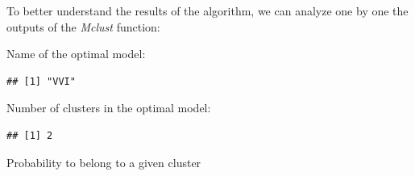 \documentclass[
]{article}
\newenvironment{Shaded}{\begin{snugshade}}{\end{snugshade}}
\newcommand{\AttributeTok}[1]{\textcolor[rgb]{0.77,0.63,0.00}{#1}}
\newcommand{\ConstantTok}[1]{\textcolor[rgb]{0.00,0.00,0.00}{#1}}
\newcommand{\DecValTok}[1]{\textcolor[rgb]{0.00,0.00,0.81}{#1}}
\newcommand{\FunctionTok}[1]{\textcolor[rgb]{0.00,0.00,0.00}{#1}}
\newcommand{\NormalTok}[1]{#1}
\newcommand{\SpecialCharTok}[1]{\textcolor[rgb]{0.00,0.00,0.00}{#1}}
\newcommand{\StringTok}[1]{\textcolor[rgb]{0.31,0.60,0.02}{#1}}
\begin{document}
To better understand the results of the algorithm, we can analyze one by
one the outputs of the \emph{Mclust} function:

Name of the optimal model:

\begin{Shaded}
\end{Shaded}

\begin{verbatim}
## [1] "VVI"
\end{verbatim}

Number of clusters in the optimal model:

\begin{Shaded}
\end{Shaded}

\begin{verbatim}
## [1] 2
\end{verbatim}

Probability to belong to a given cluster

\begin{Shaded}
\end{Shaded}
\end{document}
